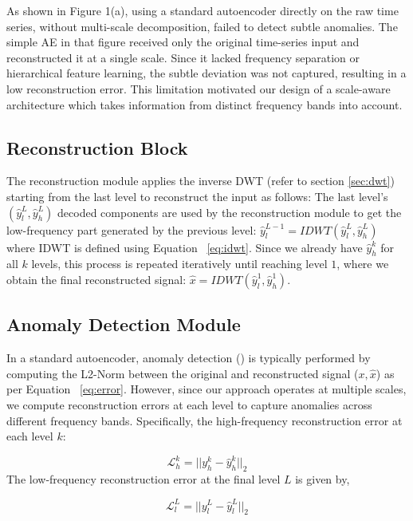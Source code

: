 As shown in Figure 1(a), using a standard autoencoder directly on the raw time series, without multi-scale decomposition, failed to detect subtle anomalies. The simple AE in that figure received only the original time-series input and reconstructed it at a single scale. Since it lacked frequency separation or hierarchical feature learning, the subtle deviation was not captured, resulting in a low reconstruction error. This limitation motivated our design of a scale-aware architecture which takes information from distinct frequency bands into account.  

\subsection{Reconstruction Block}
\label{sec:reconstruction}
The reconstruction module applies the inverse DWT (refer to section \ref{sec:dwt}) starting from the last level to
reconstruct the input as follows: The last level's $(\hat{y}_l^L,\hat{y}_h^L)$ decoded components are used by the
reconstruction module to get the low-frequency part generated by the previous level: $\hat{y}_l^{L-1} =
IDWT(\hat{y}_l^L,\hat{y}_h^L)$ where IDWT is defined using Equation ~\eqref{eq:idwt}. Since we already have
$\hat{y}_h^k$ for all $k$ levels, this process is repeated iteratively until reaching level $1$, where we obtain the
final reconstructed signal: $\hat{x} = IDWT(\hat{y}_l^1,\hat{y}_h^1)$.

\subsection{Anomaly Detection Module}
In a standard autoencoder, anomaly detection (\cite{anomaly-review}) is typically performed by computing the L2-Norm
between the original and reconstructed signal ($x,\hat{x}$) as per Equation ~\eqref{eq:error}. However, since our
approach operates at multiple scales, we compute reconstruction errors at each level to capture anomalies across
different frequency bands. Specifically, the high-frequency reconstruction error at each level $k$:

\begin{equation}
    \mathcal{L}_h^k = ||y_h^k-\hat{y}_h^k||_2
    \label{eq:err_h}
\end{equation}
The low-frequency reconstruction error at the final level $L$ is given by,

\begin{equation}
    \mathcal{L}_l^L = ||y_l^L-\hat{y}_l^L||_2
    \label{eq:err_l}
\end{equation}

